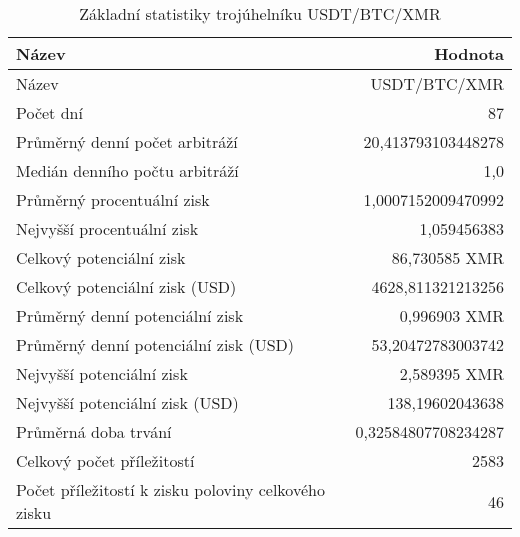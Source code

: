 \begin{table}\centering
\caption{Základní statistiky trojúhelníku USDT/BTC/XMR}
\label{USDTBTCXMR_stats}
\begin{tabular}{|| l | r ||}
\hline Název & Hodnota \\ 
\hline\hline Název & USDT/BTC/XMR \\ 
\hline Počet dní & 87 \\ 
\hline Průměrný denní počet arbitráží & 20,413793103448278 \\ 
\hline Medián denního počtu arbitráží & 1,0 \\ 
\hline Průměrný procentuální zisk & 1,0007152009470992 \\ 
\hline Nejvyšší procentuální zisk & 1,059456383 \\ 
\hline Celkový potenciální zisk & 86,730585 XMR \\ 
\hline Celkový potenciální zisk (USD) & 4628,811321213256 \\ 
\hline Průměrný denní potenciální zisk & 0,996903 XMR \\ 
\hline Průměrný denní potenciální zisk (USD) & 53,20472783003742 \\ 
\hline Nejvyšší potenciální zisk & 2,589395 XMR \\ 
\hline Nejvyšší potenciální zisk (USD) & 138,19602043638 \\ 
\hline Průměrná doba trvání & 0,32584807708234287 \\ 
\hline Celkový počet příležitostí & 2583 \\ 
\hline Počet příležitostí k zisku poloviny celkového zisku & 46 \\ 
\hline
\end{tabular}
\end{table}